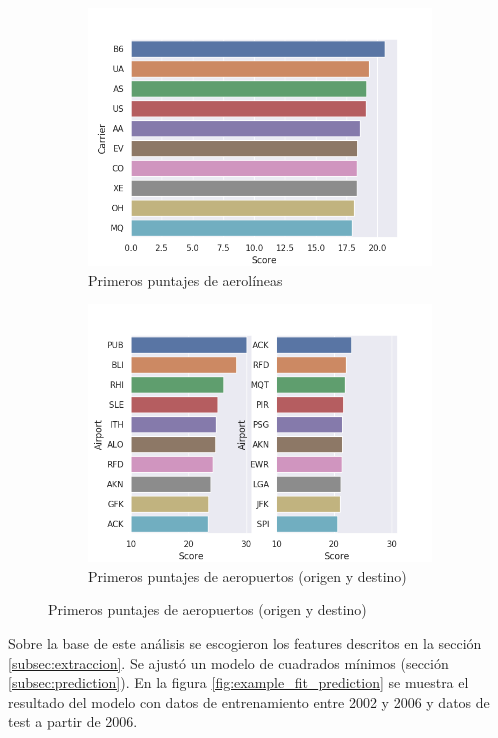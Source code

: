 \begin{figure}[hbtp]
\centering
\begin{subfigure}{.5\textwidth}
      \centering
      \includegraphics[width=0.8\linewidth]{plots/carrier_scores_2008.png}
      \caption{Primeros puntajes de aerol\'ineas}
      \label{fig:carrier_scores}
    \end{subfigure}%
\begin{subfigure}{.5\textwidth}
      \centering
      \includegraphics[width=0.8\linewidth]{plots/airport_scores_2008.png}
      \caption{Primeros puntajes de aeropuertos (origen y destino)}
      \label{fig:airport_scores}
    \end{subfigure}
\end{figure}

Sobre la base de este an\'alisis se escogieron los features descritos en la secci\'on \ref{subsec:extraccion}.
Se ajust\'o un modelo de cuadrados m\'inimos (secci\'on \ref{subsec:prediction}).
En la figura \ref{fig:example_fit_prediction} se muestra el resultado del modelo con datos de entrenamiento
entre 2002 y 2006 y datos de test a partir de 2006.

